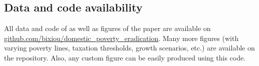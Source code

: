   \begin{small} %





\section*{\normalsize Data and code availability}

All data and code of as well as figures of the paper are available on \href{https://github.com/bixiou/domestic_poverty_eradication}{github.com/bixiou/domestic\_poverty\_eradication}. Many more figures (with varying poverty lines, taxation thresholds, growth scenarios, etc.) are available on the repository. %
Also, any custom figure can be easily produced using this code.

\end{small}  %

\theendnotes


%  

